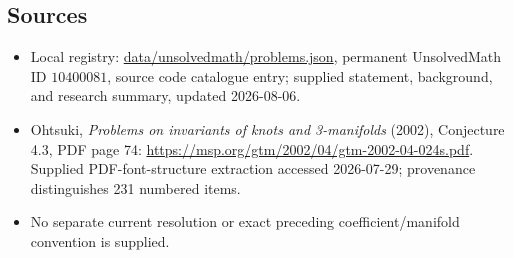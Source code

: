 \documentclass[11pt]{article}
\begin{document}
\subsection{Sources}
\begin{itemize}
\item Local registry: \url{data/unsolvedmath/problems.json}, permanent UnsolvedMath ID \(10400081\), source code catalogue entry; supplied statement, background, and research summary, updated 2026-08-06.
\item Ohtsuki, \emph{Problems on invariants of knots and 3-manifolds} (2002), Conjecture 4.3, PDF page 74: \url{https://msp.org/gtm/2002/04/gtm-2002-04-024s.pdf}. Supplied PDF-font-structure extraction accessed 2026-07-29; provenance distinguishes 231 numbered items.
\item No separate current resolution or exact preceding coefficient/manifold convention is supplied.
\end{itemize}
\end{document}

